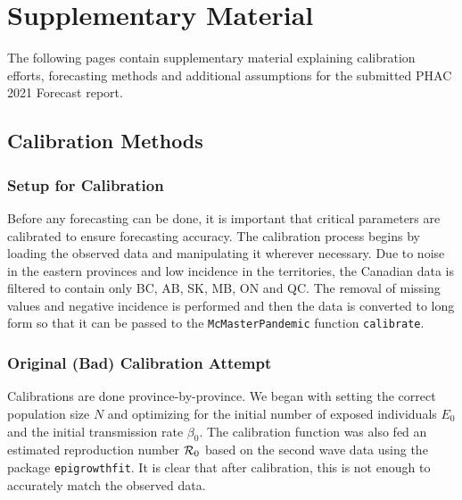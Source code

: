 \documentclass[12pt]{article}\usepackage[]{graphicx}\usepackage[]{color}
\begin{document}

\section*{Supplementary Material}
The following pages contain supplementary material explaining calibration efforts, forecasting methods and additional assumptions for the submitted PHAC 2021 Forecast report.


\subsection*{Calibration Methods}

\subsubsection*{Setup for Calibration}

Before any forecasting can be done, it is important that critical parameters are calibrated to ensure forecasting accuracy. The calibration process begins by loading the observed data and manipulating it wherever necessary. Due to noise in the eastern provinces and low incidence in the territories, the Canadian data is filtered to contain only BC, AB, SK, MB, ON and QC. The removal of missing values and negative incidence is performed and then the data is converted to long form so that it can be passed to the \texttt{McMasterPandemic} function \texttt{calibrate}.




\subsubsection*{Original (Bad) Calibration Attempt}
Calibrations are done province-by-province. We began with setting the correct population size $N$ and optimizing for the initial number of exposed individuals $E_0$ and the initial transmission rate $\beta_0$. The calibration function was also fed an estimated reproduction number ${\cal R}_0$ based on the second wave data using the \Rlogo package \texttt{epigrowthfit}. It is clear that after calibration, this is not enough to accurately match the observed data. 
\end{document}
